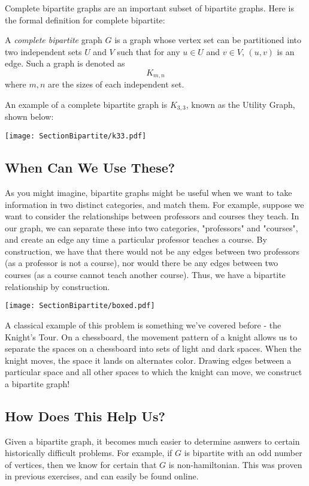 Complete bipartite graphs are an important subset of bipartite graphs. Here is the formal definition for complete bipartite:

\begin{definition}
    A \textit{complete bipartite} graph $G$ is a graph whose vertex set can be partitioned into two independent sets $U$ and $V$ such that for any $u \in U$ and $v \in V$, $(u, v)$ is an edge. Such a graph is denoted as \[ K_{m,n} \] where $m, n$ are the sizes of each independent set.
\end{definition}

An example of a complete bipartite graph is $K_{3,3}$, known as the Utility Graph, shown below:
\begin{center}
    \texttt{[image: SectionBipartite/k33.pdf]}
\end{center}

\subsection{When Can We Use These?}
As you might imagine, bipartite graphs might be useful when we want to take information in two distinct categories, and match them. For example, suppose we want to consider the relationships between professors and courses they teach. In our graph, we can separate these into two categories, "professors" and "courses", and create an edge any time a particular professor teaches a course. By construction, we have that there would not be any edges between two professors (as a professor is not a course), nor would there be any edges between two courses (as a course cannot teach another course). Thus, we have a bipartite relationship by construction.

\begin{center}
    \texttt{[image: SectionBipartite/boxed.pdf]}
\end{center}

A classical example of this problem is something we've covered before - the Knight's Tour. On a chessboard, the movement pattern of a knight allows us to separate the spaces on a chessboard into sets of light and dark spaces. When the knight moves, the space it lands on alternates color. Drawing edges between a particular space and all other spaces to which the knight can move, we construct a bipartite graph!

\subsection{How Does This Help Us?}
Given a bipartite graph, it becomes much easier to determine asnwers to certain historically difficult problems. For example, if $G$ is bipartite with an odd number of vertices, then we know for certain that $G$ is non-hamiltonian. This was proven in previous exercises, and can easily be found online. 

